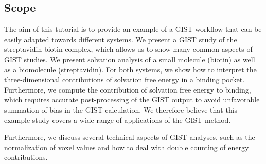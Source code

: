 \documentclass[9pt,tutorial]{livecoms}
\begin{document}
%
%
%

\subsection{Scope}
The aim of this tutorial is to provide an example of a GIST workflow that can be easily adapted towards different systems.
We present a GIST study of the streptavidin-biotin complex, which allows us to show many common aspects of GIST studies.
We present solvation analysis of a small molecule (biotin) as well as a biomolecule (streptavidin).
For both systems, we show how to interpret the three-dimensional contributions of solvation free energy in a binding pocket.
Furthermore, we compute the contribution of solvation free energy to binding, which requires accurate post-processing of the GIST output to avoid unfavorable summation of bias in the GIST calculation.
We therefore believe that this example study covers a wide range of applications of the GIST method.

Furthermore, we discuss several technical aspects of GIST analyses, such as the normalization of voxel values and how to deal with double counting of energy contributions. 
%
\end{document}
